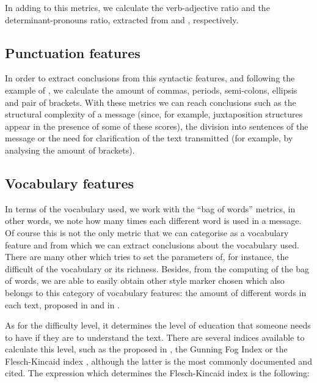 In adding to this metrics, we calculate the verb-adjective ratio and the determinant-pronouns ratio, extracted from \cite{antosch1969diagnosis} and \cite{brainerd1974weighting}, respectively.

\subsection{Punctuation features}\label{ssect:punctf}

In order to extract conclusions from this syntactic features, and following the example of \cite{calix2008stylometry}, we calculate the amount of commas, periods, semi-colons, ellipsis and pair of brackets. With these metrics we can reach conclusions such as the structural complexity of a message (since, for example, juxtaposition structures appear in the presence of some of these scores), the division into sentences of the message or the need for clarification of the text transmitted (for example, by analysing the amount of brackets).

\subsection{Vocabulary features}\label{ssect:vocabf}

In terms of the vocabulary used, we work with the ``bag of words'' metrics, in other words, we note how many times each different word is used in a message. Of course this is not the only metric that we can categorise as a vocabulary feature and from which we can extract conclusions about the vocabulary used. There are many other which tries to set the parameters of, for instance, the difficult of the vocabulary or its richness. Besides, from the computing of the bag of words, we are able to easily obtain other style marker chosen which also belongs to this category of vocabulary features: the amount of different words in each text, proposed in \cite{ril2014determination} and in \cite{corney2001identifying}.

As for the difficulty level, it determines the level of education that someone needs to have if they are to understand the text. There are several indices available to calculate this level, such as the proposed in \cite{dale1948formula}, the Gunning Fog Index \citep{wiki:gunning} or the Flesch-Kincaid index \citep{dubay2004principles}, although the latter is the most commonly documented and cited. The expression which determines the Flesch-Kincaid index is the following:

